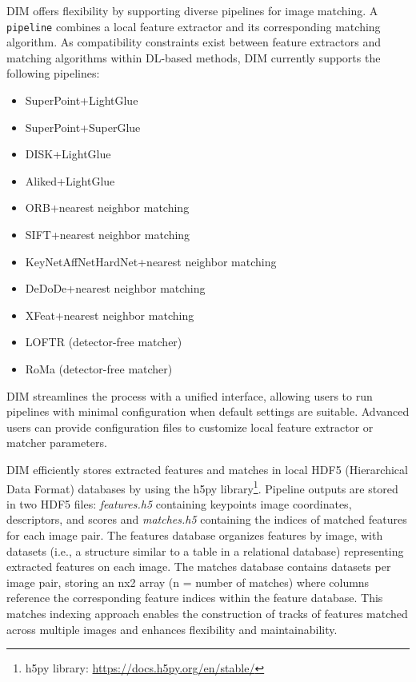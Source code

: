 DIM offers flexibility by supporting diverse pipelines for image matching. 
A \texttt{pipeline} combines a local feature extractor and its corresponding matching algorithm. 
As compatibility constraints exist between feature extractors and matching algorithms within DL-based methods, DIM currently supports the following pipelines:
\begin{itemize}
    \item SuperPoint+LightGlue
    \item SuperPoint+SuperGlue
    \item DISK+LightGlue
    \item Aliked+LightGlue
    \item ORB+nearest neighbor matching
    \item SIFT+nearest neighbor matching
    \item KeyNetAffNetHardNet+nearest neighbor matching
    \item DeDoDe+nearest neighbor matching
    \item XFeat+nearest neighbor matching    
    \item LOFTR (detector-free matcher)
    \item RoMa (detector-free matcher)
\end{itemize}

DIM streamlines the process with a unified interface, allowing users to run pipelines with minimal configuration when default settings are suitable. 
Advanced users can provide configuration files to customize local feature extractor or matcher parameters.

DIM efficiently stores extracted features and matches in local HDF5 (Hierarchical Data Format) databases by using the h5py library\footnote{h5py library: \url{https://docs.h5py.org/en/stable/}}. 
Pipeline outputs are stored in two HDF5 files: \textit{features.h5} containing keypoints image coordinates, descriptors, and scores and \textit{matches.h5} containing the indices of matched features for each image pair. 
The features database organizes features by image, with datasets (i.e., a structure similar to a table in a relational database) representing extracted features on each image. 
The matches database contains datasets per image pair, storing an nx2 array (n = number of matches) where columns reference the corresponding feature indices within the feature database. 
This matches indexing approach enables the construction of tracks of features matched across multiple images and enhances flexibility and maintainability.


